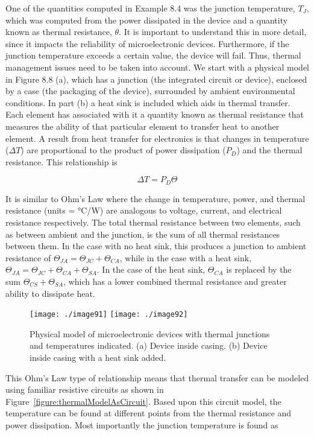 One of the quantities computed in Example 8.4 was the junction
temperature, $T_J$, which was computed from the
power dissipated in the device and a quantity known as thermal
resistance, $\theta$. It is important to understand this in more detail,
since it impacts the reliability of microelectronic devices.
Furthermore, if the junction temperature exceeds a certain value, the
device will fail. Thus, thermal management issues need to be taken into
account. We start with a physical model in Figure 8.8 (a), which has a
junction (the integrated circuit or device), enclosed by a case (the
packaging of the device), surrounded by ambient environmental
conditions. In part (b) a heat sink is included which aids in thermal
transfer. Each element has associated with it a quantity known as
thermal resistance that measures the ability of that particular element
to transfer heat to another element. A result from heat transfer for
electronics is that changes in temperature ($\Delta T$) are proportional
to the product of power dissipation ($P_D$) and the thermal resistance.
This relationship is

\begin{equation}
\label{equ:thermalHeatFlow}
\Delta T = P_D \Theta
\end{equation}

It is similar to Ohm's Law where the change in temperature, power, and
thermal resistance (units = °C/W) are analogous to voltage, current, and
electrical resistance respectively. The total thermal resistance between
two elements, such as between ambient and the junction, is the sum of
all thermal resistances between them. In the case with no heat sink,
this produces a junction to ambient resistance of
$\Theta_{JA} =  \Theta_{JC} + \Theta_{CA}$, while in the case with a heat
sink, 
$\Theta_{JA} = \Theta_{JC} + \Theta_{CA} + \Theta_{SA}$. In the case 
of the heat sink, $\Theta_{CA}$ is replaced by the sum
$\Theta_{CS} + \Theta_{SA}$, which has a lower combined
thermal resistance and greater ability to dissipate heat.

\begin{figure}
\texttt{[image: ./image91]}
\texttt{[image: ./image92]}
\caption{Physical model of microelectronic devices with
thermal junctions and temperatures indicated. (a) Device inside casing.
(b) Device inside casing with a heat sink added.}
\label{figure:thermalModelsBJT}
\end{figure}

This Ohm's Law type of relationship means that thermal transfer can be
modeled using familiar resistive circuits as shown in 
Figure~\ref{figure:thermalModelAsCircuit}. Based
upon this circuit model, the temperature can be found at different
points from the thermal resistance and power dissipation. Most
importantly the junction temperature is found as

